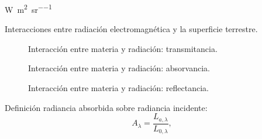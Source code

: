 
\begin{frame}{}
\si{\watt\per\square\meter\per\steradian}
\end{frame}


\begin{frame}{}
 Interacciones entre radiación electromagnética y la superficie terrestre.
\end{frame}



\begin{frame}{}
  \begin{figure}
    \centering
    \caption{Interacción entre materia y radiación: transmitancia.}
    \label{}
  \end{figure}
\end{frame}



\begin{frame}{}
  \begin{figure}
    \centering
    \caption{Interacción entre materia y radiación: absorvancia.}
    \label{}
  \end{figure}
\end{frame}


\begin{frame}{}
  \begin{figure}
    \centering
    \caption{Interacción entre materia y radiación: reflectancia.}
    \label{}
  \end{figure}
\end{frame}


\begin{frame}{}
    \begin{block}{Definición}
      radiancia absorbida sobre radiancia incidente:
        \begin{equation}
         A_\lambda = \frac{L_{a,\lambda}}{L_{0,\lambda}} ,
        \end{equation}
         \end{block}
\end{frame}

